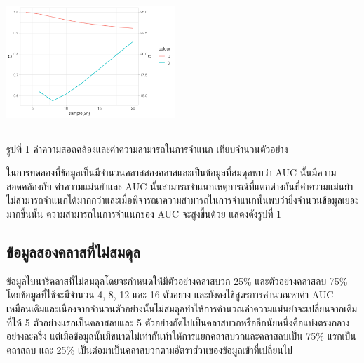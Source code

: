 \documentclass[twoside, twocolumn, 12pt]{article}
\begin{document}
\begin{center}\includegraphics[height=2in,width=2.5in]{pic/Rplot01} \end{center}
\begin{center} รูปที่ 1 ค่าความสอดคล้องและค่าความสามารถในการจำแนก เทียบจำนวนตัวอย่าง \end{center}

ในการทดลองที่ข้อมูลเป็นมีจำนวนคลาสสองคลาสและเป็นข้อมูลที่สมดุลพบว่า AUC นั้นมีความสอดคล้องกับ ค่าความแม่นยำและ AUC นั้นสามารถจำแนกเหตุการณ์ที่แตกต่างกันที่ค่าความแม่นยำไม่สามารถจำแนกได้มากกว่าและเมื่อพิจารณาความสามารถในการจำแนกนั้นพบว่ายิ่งจำนวนข้อมูลเยอะมากขึ้นนั้น ความสามารถในการจำแนกของ AUC จะสูงขึ้นด้วย แสดงดังรูปที่ 1
\subsection{ข้อมูลสองคลาสที่ไม่สมดุล}
\quad ข้อมูลไบนารีคลาสที่ไม่สมดุลโดยจะกำหนดให้มีตัวอย่างคลาสบวก 25\% และตัวอย่างคลาสลบ 75\% โดยข้อมูลที่ใช้จะมีจำนวน 4, 8, 12 และ 16 ตัวอย่าง และยังคงใช้สูตรการคำนวณหาค่า AUC เหมือนเดิมและเนื่องจากจำนวนตัวอย่างนั้นไม่สมดุลทำให้การคำนวณค่าความแม่นยำจะเปลี่ยนจากเดิมที่ให้ 5 ตัวอย่างแรกเป็นคลาสลบและ 5 ตัวอย่างถัดไปเป็นคลาสบวกหรืออีกนัยหนึ่งคือแบ่งตรงกลางอย่างละครึ่ง แต่เมื่อข้อมูลนั้นมีขนาดไม่เท่ากันทำให้การแยกคลาสบวกและคลาสลบเป็น 75\% แรกเป็นคลาสลบ และ 25\% เป็นต่อมาเป็นคลาสบวกตามอัตราส่วนของข้อมูลเข้าที่เปลี่ยนไป
\end{document}
